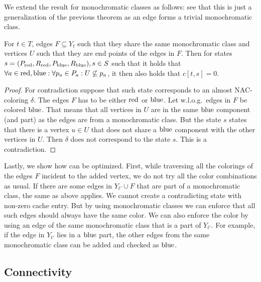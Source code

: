 We extend the result for monochromatic classes as follows:
see that this is just a generalization of the previous theorem
as an edge forms a trivial monochromatic class.
%
\begin{theorem}
	For \( t \in T \),
	edges \( F \subseteq Y_t \) such that
	they share the same monochromatic class
	and vertices \( U \) such that they are end points of the edges in \( F \).
	Then for states \( s = (P_{\text{red}}, R_{\text{red}}, P_{\text{blue}}, R_{\text{blue}}), s \in S \)
	such that it holds that
	\( \forall a \in {\text{red}, \text{blue}}: \forall p_a \in P_a : U \not\subseteq p_a \),
	it then also holds that \( c[t, s] = 0 \).
\end{theorem}
%
%
\begin{proof}
	For contradiction suppose that such state corresponds to an almost NAC-coloring \( \delta \).
	The edges \( F \) has to be either \( \text{red} \) or \( \text{blue} \).
	Let w.l.o.g.\ edges in \( F \) be colored \( \text{blue} \).
	That means that all vertices in \( U \) are in the same \( \text{blue} \) component (and part)
	as the edges are from a monochromatic class.
	But the state \( s \) states that there is a vertex \( u \in U \)
	that does not share a \( \text{blue} \) component with the other vertices in \( U \).
	Then \( \delta \) does not correspond to the state \( s \).
	This is a contradiction.
\end{proof}
%

Lastly, we show how \IntroduceVertexWithEdgesNode{} can be optimized.
First, while traversing all the colorings of the edges \( F \) incident to the added vertex,
we do not try all the color combinations as usual. If there are some edges
in \( Y_{t'} \cup F \) that are part of a monochromatic class,
the same as above applies. We cannot create a contradicting state with non-zero
cache entry. But by using monochromatic classes
we can enforce that all such edges should always have the same color.
We can also enforce the color by using an edge of the same monochromatic class
that is a part of \( Y_{t'} \).
For example, if the edge in \( Y_{t'} \) lies in a \( \text{blue} \) part,
the other edges from the same monochromatic class
can be added and checked as \( \text{blue} \).


\subsection{Connectivity}


